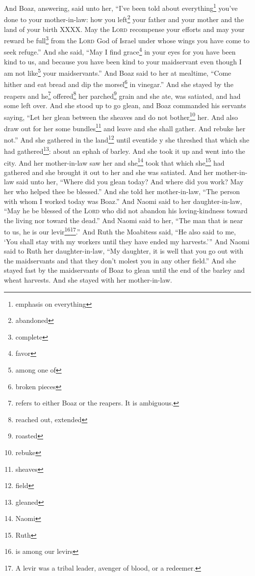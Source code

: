 


\begin{enumerate*}[mode=unboxed]
     And Boaz, answering, said unto her, ``I've been told about everything\footnote{emphasis on everything} you've done to your mother-in-law: how you left\footnote{abandoned} your father and your mother and the land of your birth XXXX.%
     May the \textsc{Lord} recompense your efforts and may your reward be full\footnote{complete} from the \textsc{Lord} God of Israel under whose wings you have come to seek refuge.''%
     And she said, ``May I find grace\footnote{favor} in your eyes for you have been kind to us, and because you have been kind to your maidservant even though I am not like\footnote{among one of} your maidservants.''%
     And Boaz said to her at mealtime, ``Come hither and eat bread and dip the morsel\footnote{broken pieces} in vinegar.'' And she stayed by the reapers and he\footnote{refers to either Boaz or the reapers. It is ambiguous.} offered\footnote{reached out, extended} her parched\footnote{roasted} grain and she ate, was satiated, and had some left over.%
     And she stood up to go glean, and Boaz commanded his servants saying, ``Let her glean between the sheaves and do not bother\footnote{rebuke} her.%
     And also draw out for her some bundles\footnote{sheaves} and leave and she shall gather. And rebuke her not.''%
     And she gathered in the land\footnote{field} until eventide y she threshed that which she had gathered\footnote{gleaned}: about an ephah of barley.%
     And she took it up and went into the city. And her mother-in-law saw her and she\footnote{Naomi} took that which she\footnote{Ruth} had gathered and she brought it out to her and she was satiated.%
     And her mother-in-law said unto her, ``Where did you glean today? And where did you work? May her who helped thee be blessed.'' And she told her mother-in-law, ``The person with whom I worked today was Boaz.''%
     And Naomi said to her daughter-in-law, ``May he be blessed of the \textsc{Lord} who did not abandon his loving-kindness toward the living nor toward the dead.'' And Naomi said to her, ``The man that is near to us, he is our levir\footnote{is among our levirs}\footnote{A levir was a tribal leader, avenger of blood, or a redeemer.}.''%
     And Ruth the Moabitess said, ``He also said to me, `You shall stay with my workers until they have ended my harvests.'''%
     And Naomi said to Ruth her daughter-in-law, ``My daughter, it is well that you go out with the maidservants and that they don't molest you in any other field.''%
     And she stayed fast by the maidservants of Boaz to glean until the end of the barley and wheat harvests. And she stayed with her mother-in-law.%
\end{enumerate*}

